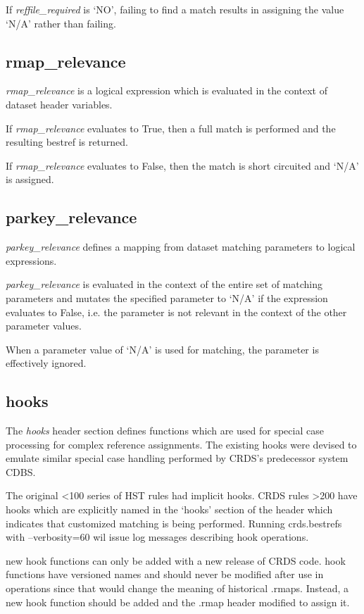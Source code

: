 \documentclass[letterpaper,10pt,english]{sphinxmanual}
\begin{document}
If \emph{reffile\_required} is `NO',  failing to find a match results in assigning the value `N/A' rather than failing.


\subsection{rmap\_relevance}
\label{rmap_syntax:rmap-relevance}
\emph{rmap\_relevance} is a logical expression which is evaluated in the context of dataset header variables.

If \emph{rmap\_relevance} evaluates to True, then a full match is performed and the resulting bestref is returned.

If \emph{rmap\_relevance} evaluates to False, then the match is short circuited and `N/A' is assigned.


\subsection{parkey\_relevance}
\label{rmap_syntax:parkey-relevance}
\emph{parkey\_relevance} defines a mapping from dataset matching parameters to logical expressions.

\emph{parkey\_relevance} is evaluated in the context of the entire set of matching parameters and mutates
the specified parameter to `N/A' if the expression evaluates to False,  i.e. the parameter is not relevant
in the context of the other parameter values.

When a parameter value of `N/A' is used for matching, the parameter is effectively ignored.


\subsection{hooks}
\label{rmap_syntax:hooks}
The \emph{hooks} header section defines functions which are used for special case processing for complex reference
assignments.   The existing hooks were devised to emulate similar special case handling performed by CRDS's
predecessor system CDBS.

The original \textless{}100 series of HST rules had implicit hooks.  CRDS rules \textgreater{}200 have hooks which are explicitly
named in the `hooks' section of the header which indicates that customized matching is being performed.   Running
crds.bestrefs with --verbosity=60 wil issue log messages describing hook operations.

new hook functions can only be added with a new release of CRDS code.   hook functions have versioned names and should
never be modified after use in operations since that would change the meaning of historical .rmaps.  Instead,  a new
hook function should be added and the .rmap header modified to assign it.
\end{document}
